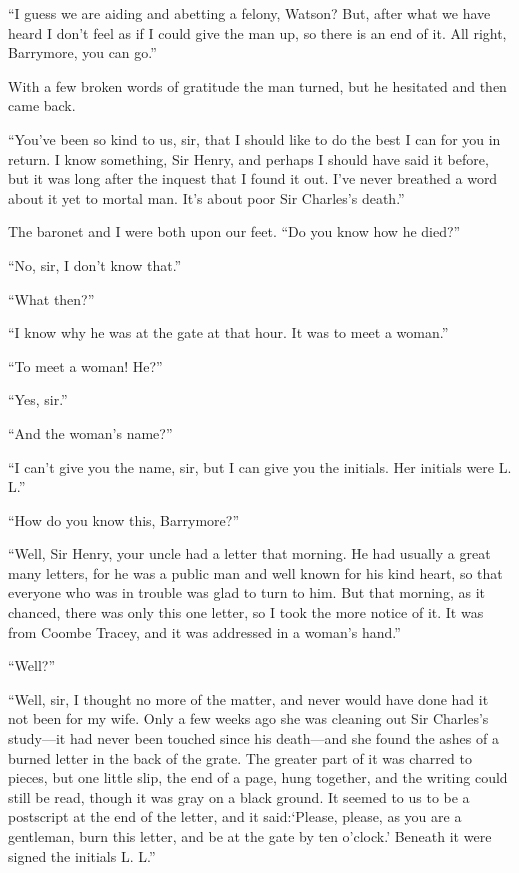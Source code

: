 \documentclass[paper=5.5in:8.5in,BCOR=7mm,twoside,DIV=calc,12pt,usegeometry,openany,chapterprefix,endperiod]{scrbook} %
\begin{document}
\enquote{I guess we are aiding and abetting a felony, Watson? But, after what we have heard I don't feel as if I could give the man up, so there is an end of it. All right, Barrymore, you can go.}

With a few broken words of gratitude the man turned, but he hesitated and then came back.

\enquote{You've been so kind to us, sir, that I should like to do the best I can for you in return. I know something, Sir Henry, and perhaps I should have said it before, but it was long after the inquest that I found it out. I've never breathed a word about it yet to mortal man. It's about poor Sir Charles's death.}

The baronet and I were both upon our feet. \enquote{Do you know how he died?}

\enquote{No, sir, I don't know that.}

\enquote{What then?}

\enquote{I know why he was at the gate at that hour. It was to meet a woman.}

\enquote{To meet a woman! He?}

\enquote{Yes, sir.}

\enquote{And the woman's name?}

\enquote{I can't give you the name, sir, but I can give you the initials. Her initials were L. L.}

\enquote{How do you know this, Barrymore?}

\enquote{Well, Sir Henry, your uncle had a letter that morning. He had usually a great many letters, for he was a public man and well known for his kind heart, so that everyone who was in trouble was glad to turn to him. But that morning, as it chanced, there was only this one letter, so I took the more notice of it. It was from Coombe Tracey, and it was addressed in a woman's hand.}

\enquote{Well?}

\enquote{Well, sir, I thought no more of the matter, and never would have done had it not been for my wife. Only a few weeks ago she was cleaning out Sir Charles's study\nobreakdash---it had never been touched since his death\nobreakdash---and she found the ashes of a burned letter in the back of the grate. The greater part of it was charred to pieces, but one little slip, the end of a page, hung together, and the writing could still be read, though it was gray on a black ground. It seemed to us to be a postscript at the end of the letter, and it said:\enquote{Please, please, as you are a gentleman, burn this letter, and be at the gate by ten o'clock.} Beneath it were signed the initials L. L.}
\end{document}
